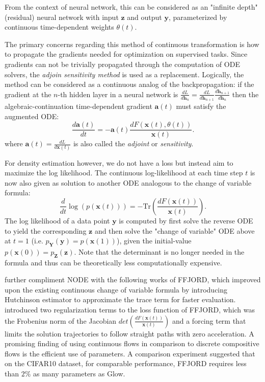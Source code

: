 From the context of neural network, this can be considered as an
"infinite depth" (residual) neural network with input $\mathbf{z}$ and output
$\mathbf{y}$, parameterized by continuous time-dependent weights $\theta(t)$.

The primary concerns regarding this method of continuous transformation is how
to propagate the gradients needed for optimization on supervised tasks. Since
gradients can not be trivially propagated through the computation of ODE
solvers, the \textit{adjoin sensitivity method} is used as a replacement. Logically, the
method can be considered as a continuous analog of the backpropagation:
if the gradient at the $n$-th hidden layer in a neural network is
$\frac{dL}{d \textbf{h}_n} = \frac{dL}{d \mathbf{h}_{n+1}} \frac{d
\mathbf{h}_{n+1}}{d \mathbf{h}_n}$ then the algebraic-continuation time-dependent gradient
$\mathbf{a}(t)$ must satisfy the augmented ODE:
$$
\frac{d\mathbf{a}(t)}{dt} = -\mathbf{a}(t) \frac{dF(\mathbf{x}(t),
\theta(t))}{\mathbf{x}(t)}
.$$
where $\mathbf{a}(t) = \frac{dL}{d\mathbf{x}(t)}$ is also called the \textit{adjoint} or
\textit{sensitivity}.

For density estimation however, we do not have a loss but instead aim to
maximize the log likelihood. The continuous log-likelihood
at each time step $t$ is now also given as solution to another ODE analogous to
the change of variable formula:
$$
\frac{d}{dt}\log(p(\mathbf{x}(t))) =
-\text{Tr}\left(\frac{dF(\mathbf{x}(t))}{\mathbf{x}(t)}\right)
.$$
The log likelihood of a data point $\mathbf{y}$ is computed by first solve the
reverse ODE to yield the corresponding $\mathbf{z}$ and then solve the "change of
variable" ODE above at $t=1$ (i.e. $p_{\mathbf{Y}}(\mathbf{y}) =
p(\mathbf{x}(1))$), given the initial-value $p(\mathbf{x}(0)) =
p_{\mathbf{Z}}(\mathbf{z})$.
Note that the determinant is no longer needed in the formula and thus can be
theoretically less computationally expensive.

\cite{grathwohlFFJORDFreeformContinuous2018} further compliment NODE with the
following works of FFJORD, which improved upon the existing continuous change of
variable formula by introducing Hutchinson estimator to approximate the trace
term for faster evaluation. \cite{finlayHowTrainYour2020} introduced two
regularization terms to the loss function of FFJORD, which was the Frobenius
norm of the Jacobian $det\left(\frac{dF(\mathbf{x}(t))}{\mathbf{x}(t)}\right)$
and a forcing term that limits the solution trajectories to follow straight
paths with zero acceleration. A promising finding of using continuous flows in
comparison to discrete compositive flows is the efficient use of parameters. A
comparison experiment suggested that on the CIFAR10 dataset, for comparable
performance, FFJORD requires less than $2\%$ as many parameters as Glow.


